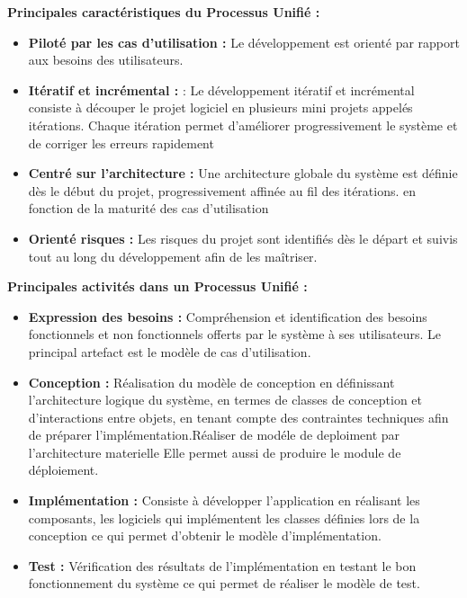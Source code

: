 \textbf{Principales caractéristiques du Processus Unifié :}

\begin{itemize}[leftmargin=*, noitemsep]
    \item \textbf{Piloté par les cas d'utilisation :} Le développement est orienté
    par rapport aux besoins des utilisateurs.

    \item \textbf{Itératif et incrémental :} : Le développement itératif et incrémental consiste à découper le projet logiciel en plusieurs
    mini projets appelés itérations.
    Chaque itération permet d’améliorer progressivement le système et de corriger les erreurs rapidement

    \item \textbf{Centré sur l'architecture :} Une architecture globale du système
    est définie dès le début du projet, progressivement affinée au fil des itérations.
    en fonction de la maturité des cas d’utilisation
    \item \textbf{Orienté risques :} Les risques du projet sont identifiés dès le
    départ et suivis tout au long du développement afin de les maîtriser.
\end{itemize}

\textbf{Principales activités dans un Processus Unifié :}

\begin{itemize}[leftmargin=*, noitemsep]
    \item \textbf{Expression des besoins :}
    Compréhension et identification des besoins fonctionnels et non fonctionnels
    offerts par le système à ses utilisateurs. Le principal artefact est le modèle
    de cas d'utilisation.

    \item \textbf{Conception :}
    Réalisation du modèle de conception en définissant l'architecture logique du système,
    en termes de classes de conception et d'interactions entre objets, en tenant
    compte des contraintes techniques afin de préparer l'implémentation.Réaliser de modéle de deploiment  par l'architecture materielle 
    Elle permet aussi de produire le module de déploiement.

    \item \textbf{Implémentation :}
     Consiste à développer l’application en réalisant les  composants, les logiciels qui implémentent les classes définies 
     lors de la conception ce qui permet d’obtenir le modèle d’implémentation.

    \item \textbf{Test :}
    Vérification des résultats de l'implémentation en testant le bon fonctionnement
    du système ce qui permet de réaliser le modèle de test.
\end{itemize}

